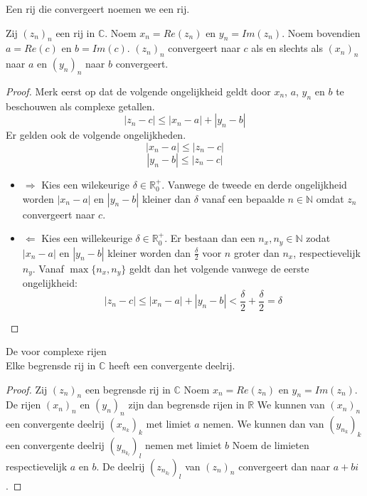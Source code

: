 \documentclass[main.tex]{subfiles}
\begin{document}
\begin{de}
  Een rij die convergeert noemen we een  rij.
\end{de}

\begin{pr}
  \label{pr:complexe-limiet-splitsen}
  Zij $(z_{n})_{n}$ een rij in $\mathbb{C}$.
  Noem $x_{n} = Re(z_{n})$ en $y_{n} = Im(z_{n})$.
  Noem bovendien $a=Re(c)$ en $b=Im(c)$.
  $(z_{n})_{n}$ convergeert naar $c$ als en slechts als $(x_{n})_{n}$ naar $a$ en $(y_{n})_{n}$ naar $b$ convergeert.

  \begin{proof}
    Merk eerst op dat de volgende ongelijkheid geldt door $x_{n}$, $a$, $y_{n}$ en $b$ te beschouwen als complexe getallen.
    \[ |z_{n}-c| \le |x_{n}-a| + |y_{n}-b| \]
    Er gelden ook de volgende ongelijkheden.
    \[ |x_{n}-a| \le |z_{n}-c| \]
    \[ |y_{n}-b| \le |z_{n}-c| \]
    \begin{itemize}
    \item $\Rightarrow$
      Kies een wilekeurige $\delta \in \mathbb{R}_{0}^{+}$.
      Vanwege de tweede en derde ongelijkheid worden $|x_{n}-a|$ en $|y_{n}-b|$ kleiner dan $\delta$ vanaf een bepaalde $n\in \mathbb{N}$ omdat $z_{n}$ convergeert naar $c$.
    \item $\Leftarrow$
      Kies een willekeurige $\delta \in \mathbb{R}_{0}^{+}$.
      Er bestaan dan een $n_{x},n_{y}\in \mathbb{N}$ zodat $|x_{n}-a|$ en $|y_{n}-b|$ kleiner worden dan $\frac{\delta}{2}$ voor $n$ groter dan $n_{x}$, respectievelijk $n_{y}$.
      Vanaf $\max\{n_{x},n_{y}\}$ geldt dan het volgende vanwege de eerste ongelijkheid:
      \[ |z_{n}-c| \le |x_{n}-a| + |y_{n}-b| < \frac{\delta}{2}+\frac{\delta}{2} = \delta \]
    \end{itemize}
  \end{proof}
\end{pr}

\begin{st}
  \label{st:bolzano-complexe-rijen}
  De  voor complexe rijen\\
  Elke begrensde rij in $\mathbb{C}$ heeft een convergente deelrij.

  \begin{proof}
    Zij $(z_{n})_{n}$ een begrensde rij in $\mathbb{C}$
    Noem $x_{n} = Re(z_{n})$ en $y_{n} = Im(z_{n})$.
    De rijen $(x_{n})_{n}$ en $(y_{n})_{n}$ zijn dan begrensde rijen in $\mathbb{R}$
    We kunnen van $(x_{n})_{n}$ een convergente deelrij $(x_{n_{k}})_{k}$ met limiet $a$ nemen.
    We kunnen dan van $(y_{n_{k}})_{k}$ een convergente deelrij $(y_{n_{k_{l}}})_{l}$ nemen met limiet $b$
    Noem de limieten respectievelijk $a$ en $b$.
    De deelrij $(z_{n_{k_{l}}})_{l}$ van $(z_{n})_{n}$ convergeert dan naar $a+bi$.
  \end{proof}
\end{st}
\end{document}
